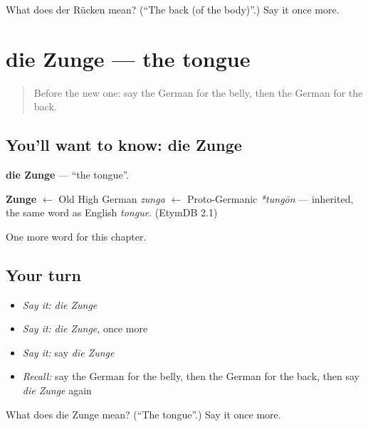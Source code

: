 \begin{tcolorbox}[breakable,colback=teal!4,colframe=teal!35!black,title={Before you move on}]
What does der Rücken mean? (\textquotedblleft{}The back (of the body)\textquotedblright{}.) Say it once more.
\end{tcolorbox}
\section[die Zunge]{die Zunge — the tongue}

\label{lesson:GE-C58-zunge}



\begin{quote}
Before the new one: say the German for the belly, then the German for the back.
\end{quote}

\subsection*{You'll want to know: die Zunge}
\textbf{die Zunge} — \textquotedblleft{}the tongue\textquotedblright{}.

\begin{cousinweb}
\textbf{Zunge} $\leftarrow$ Old High German \emph{zunga} $\leftarrow$ Proto-Germanic \emph{*tungōn} — inherited, the same word as English \emph{tongue}. (EtymDB 2.1)
\end{cousinweb}

\begin{grammarlens}[title={What you've built}]
One more word for this chapter.
\end{grammarlens}

\subsection*{Your turn}
\begin{itemize}
\raggedright
  \item \emph{Say it:} \emph{die Zunge}
  \item \emph{Say it:} \emph{die Zunge}, once more
  \item \emph{Say it:} say \emph{die Zunge}
  \item \emph{Recall:} say the German for the belly, then the German for the back, then say \emph{die Zunge} again
\end{itemize}

\begin{tcolorbox}[breakable,colback=teal!4,colframe=teal!35!black,title={Before you move on}]
What does die Zunge mean? (\textquotedblleft{}The tongue\textquotedblright{}.) Say it once more.
\end{tcolorbox}
